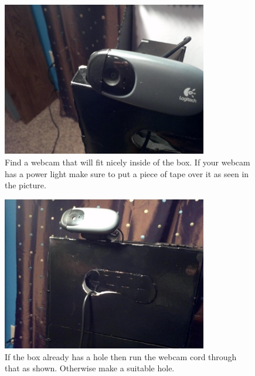 \documentclass[13pt]{article}
\begin{document}
\begin{figure}[ht!]
\centering
\includegraphics[width=0.8\textwidth]{eps/webCam.eps}
\caption{Find a webcam that will fit nicely inside of the box. If your webcam has a power light make sure to put a piece of tape over it as seen in the picture.}
\end{figure}

\begin{figure}[ht!]
\centering
\includegraphics[width=0.8\textwidth]{eps/webcamCord.eps}
\caption{If the box already has a hole then run the webcam cord through that as shown. Otherwise make a suitable hole.}
\end{figure}
\end{document}
